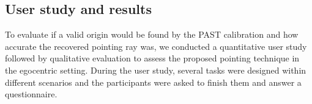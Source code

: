 \subsection{User study and results}
To evaluate if a valid origin would be found by the PAST calibration and how accurate the recovered pointing ray was, we conducted a quantitative user study followed by qualitative evaluation to assess the proposed pointing technique in the egocentric setting. During the user study, several tasks were designed within different scenarios and the participants were asked to finish them and answer a questionnaire.

